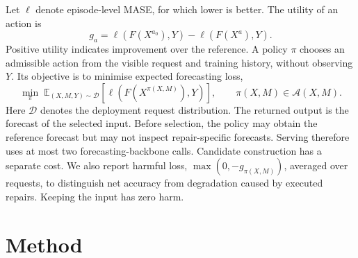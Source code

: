 \documentclass{article}
\newcommand{\calA}{\mathcal{A}}
\newcommand{\loss}{\ell}
\begin{document}
Let $\loss$ denote episode-level MASE, for which lower is better. The utility of an action is
\begin{equation}
g_a=\loss\!\left(F(X^{a_0}),Y\right)-\loss\!\left(F(X^a),Y\right).
\label{eq:utility}
\end{equation}
Positive utility indicates improvement over the reference. A policy $\pi$ chooses an
admissible action from the visible request and training history, without observing $Y$.
Its objective is to minimise expected forecasting loss,
\begin{equation}
\min_{\pi}\;\mathbb{E}_{(X,M,Y)\sim\mathcal D}
 \left[\loss\!\left(F(X^{\pi(X,M)}),Y\right)\right],
\qquad \pi(X,M)\in\calA(X,M).
\label{eq:objective}
\end{equation}
Here $\mathcal D$ denotes the deployment request distribution. The returned output is the
forecast of the selected input. Before selection, the policy may obtain the reference
forecast but may not inspect repair-specific forecasts. Serving therefore uses at most two
forecasting-backbone calls. Candidate construction has a separate cost.
We also report harmful loss, $\max(0,-g_{\pi(X,M)})$, averaged over requests, to distinguish
net accuracy from degradation caused by executed repairs. Keeping the input has zero harm.

\section{Method}
\label{sec:method}
\end{document}
